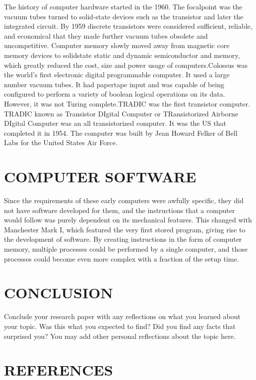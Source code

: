 \documentclass[letterpaper, 10 pt, conference]{IEEEconf}
\begin{document}
The history of computer hardware started in the 1960. The focalpoint was the  
vacuum tubes turned to solid-state devices such as the transistor and later 
the integrated circuit. By 1959 discrete transistors were considered 
sufficient, reliable, and economical that they made further vacuum tubes 
obsolete and uncompetitive. Computer memory slowly moved away from 
magnetic core memory devices to solidstate static and dynamic semiconductor and
memory, which greatly reduced the cost, size and power usage of 
computers.Colossus was the world's first electronic digital programmable 
computer. It used a large number vacuum tubes. It had papertape 
input and was capable of being configured to perform a variety of boolean 
logical operations on its data. However, it was not Turing complete.TRADIC was 
the first transistor computer. TRADIC known as Transistor DIgital Computer or 
TRansistorized Airborne DIgital Computer was an all transistorized computer. 
It was the US that completed it in 1954. The computer was built by Jean Howard 
Felker of Bell Labs for the United States Air Force. 

\section{COMPUTER SOFTWARE}
Since the requirements of these early computers were 
awfully specific, they did not have software developed 
for them, and the instructions that a computer would follow 
was purely dependent on its mechanical features. 
This changed with Manchester Mark I, which featured the 
very first stored program, giving rise to the development 
of software. By creating instructions in the form of computer 
memory, multiple processes could be performed by a single 
computer, and those processes could become even more complex 
with a fraction of the setup time.

\section{CONCLUSION}

Conclude your research paper with any reflections on what you
learned about your topic. Was this what you expected to find?
Did you find any facts that surprised you? You may add other
personal reflections about the topic here.

\section*{REFERENCES}
\end{document}
